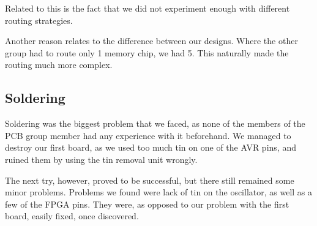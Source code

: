 Related to this is the fact that we did not experiment enough with different routing strategies.

Another reason relates to the difference between our designs. Where the other group had to route only 1 memory chip, we had 5. This naturally made the routing much more complex.

\subsection{Soldering}
Soldering was the biggest problem that we faced, as none of the members of the
\ac{PCB} group member had any experience with it beforehand. We managed to
destroy our first board, as we used too much tin on one of the AVR pins, and
ruined them by using the tin removal unit wrongly.

The next try, however, proved to be successful, but there still remained some
minor problems. Problems we found were lack of tin on the oscillator, as well as
a few of the \ac{FPGA} pins. They were, as opposed to our problem with the first
board, easily fixed, once discovered.
